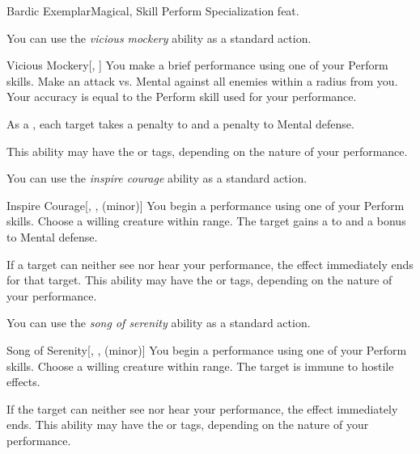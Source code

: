     \begin{feat}{Bardic Exemplar}{Magical, Skill}
        \featpre Perform Specialization feat.

         You can use the \textit{vicious mockery} ability as a standard action.
        \begin{apability}{Vicious Mockery}[, ]
            You make a brief performance using one of your Perform skills.
            Make an attack vs. Mental against all enemies within a \areahuge radius from you.
            Your accuracy is equal to the Perform skill used for your performance.

            \hit As a , each target takes a  penalty to  and a  penalty to Mental defense.

            This ability may have the  or  tags, depending on the nature of your performance.
        \end{apability}

         You can use the \textit{inspire courage} ability as a standard action.
        \begin{apability}{Inspire Courage}[, ,  (minor)]
            You begin a performance using one of your Perform skills.
            Choose a willing creature within \rngmed range.
            The target gains a   to  and a  bonus to Mental defense.

            If a target can neither see nor hear your performance, the effect immediately ends for that target.
            This ability may have the  or  tags, depending on the nature of your performance.
        \end{apability}

         You can use the \textit{song of serenity} ability as a standard action.
        \begin{apability}{Song of Serenity}[, ,  (minor)]
            You begin a performance using one of your Perform skills.
            Choose a willing creature within \rngmed range.
            The target is immune to hostile  effects.

            If the target can neither see nor hear your performance, the effect immediately ends.
            This ability may have the  or  tags, depending on the nature of your performance.
        \end{apability}


\end{feat}
